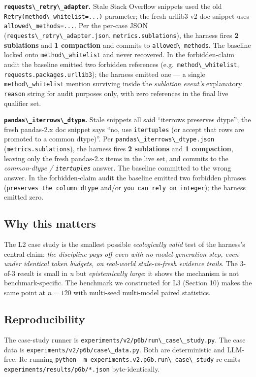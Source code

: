 \textbf{\passthrough{\lstinline!requests\_retry\_adapter!}.} Stale Stack Overflow snippets used the old \passthrough{\lstinline!Retry(method\_whitelist=...)!} parameter; the fresh urllib3 v2 doc snippet uses \passthrough{\lstinline!allowed\_methods=...!}. Per the per-case JSON (\passthrough{\lstinline!requests\_retry\_adapter.json!}, \passthrough{\lstinline!metrics.sublations!}), the harness fires \textbf{2 sublations} and \textbf{1 compaction} and commits to \passthrough{\lstinline!allowed\_methods!}. The baseline locked onto \passthrough{\lstinline!method\_whitelist!} and never recovered. In the forbidden-claim audit the baseline emitted two forbidden references (e.g.~\passthrough{\lstinline!method\_whitelist!}, \passthrough{\lstinline!requests.packages.urllib3!}); the harness emitted one --- a single \passthrough{\lstinline!method\_whitelist!} mention surviving inside the \emph{sublation event's} explanatory \passthrough{\lstinline!reason!} string for audit purposes only, with zero references in the final live qualifier set.

\textbf{\passthrough{\lstinline!pandas\_iterrows\_dtype!}.} Stale snippets all said ``iterrows preserves dtype''; the fresh pandas-2.x doc snippet says ``no, use \passthrough{\lstinline!itertuples!} (or accept that rows are promoted to a common dtype)''. Per \passthrough{\lstinline!pandas\_iterrows\_dtype.json!} (\passthrough{\lstinline!metrics.sublations!}), the harness fires \textbf{2 sublations} and \textbf{1 compaction}, leaving only the fresh pandas-2.x items in the live set, and commits to the \emph{common-dtype / \passthrough{\lstinline!itertuples!}} answer. The baseline committed to the wrong answer. In the forbidden-claim audit the baseline emitted two forbidden phrases (\passthrough{\lstinline!preserves the column dtype!} and/or \passthrough{\lstinline!you can rely on integer!}); the harness emitted zero.

\subsection{Why this matters}\label{why-this-matters}

The L2 case study is the smallest possible \emph{ecologically valid} test of the harness's central claim: \emph{the discipline pays off even with no model-generation step, even under identical token budgets, on real-world stale-vs-fresh evidence trails}. The 3-of-3 result is small in \emph{n} but \emph{epistemically large}: it shows the mechanism is not benchmark-specific. The benchmark we constructed for L3 (Section 10) makes the same point at \(n=120\) with multi-seed multi-model paired statistics.

\subsection{Reproducibility}\label{reproducibility}

The case-study runner is \passthrough{\lstinline!experiments/v2/p6b/run\_case\_study.py!}. The case data is \passthrough{\lstinline!experiments/v2/p6b/case\_data.py!}. Both are deterministic and LLM-free. Re-running \passthrough{\lstinline!python -m experiments.v2.p6b.run\_case\_study!} re-emits \passthrough{\lstinline!experiments/results/p6b/*.json!} byte-identically.
